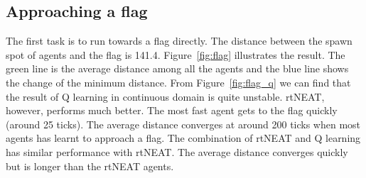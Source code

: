 \documentclass[letterpaper]{article}
\begin{document}
\subsection{Approaching a flag}
The first task is to run towards a flag directly. The distance between the spawn spot of agents and the flag is 141.4. Figure~\ref{fig:flag} illustrates the result. The green line is the average distance among all the agents and the blue line shows the change of the minimum distance. From Figure~\ref{fig:flag_q} we can find that the result of Q learning in continuous domain is quite unstable. rtNEAT, however, performs much better. The most fast agent gets to the flag quickly (around 25 ticks). The average distance converges at around 200 ticks when most agents has learnt to approach a flag. The combination of rtNEAT and Q learning has similar performance with rtNEAT. The average distance converges quickly but is longer than the rtNEAT agents. 
\end{document}
